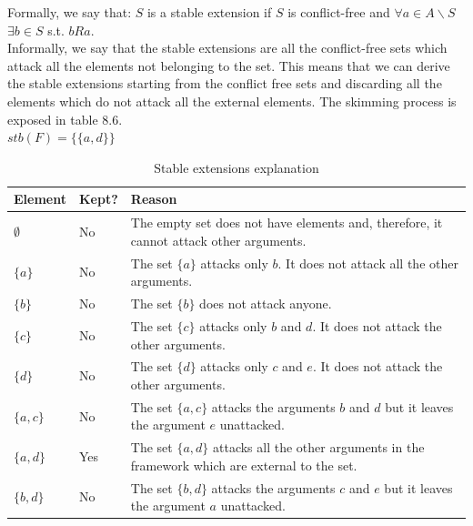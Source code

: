 \documentclass{scrbook}
\begin{document}
Formally, we say that: $S$ is a stable extension if $S$ is conflict-free and $\forall a \in A \smallsetminus S$ $\exists b \in S$ s.t. $bRa$. \\

Informally, we say that the stable extensions are all the conflict-free sets which attack all the elements not belonging to the set. This means that we can derive the stable extensions starting from the conflict free sets and discarding all the elements which do not attack all the external elements. The skimming process is exposed in table 8.6.\\

$stb(F) = \{\{a,d\}\}$ \\

\begin{table}[]
    \begin{tabularx}{\linewidth}{|p{5em}|p{4em}|X|} \hline
         \textbf{Element} & \textbf{Kept?} & \textbf{Reason} \\ \hline

        $\emptyset$ & No &
        The empty set does not have elements and, therefore, it cannot attack other arguments.\\ \hline

        $\{a\}$ & No &
        The set $\{a\}$ attacks only $b$. It does not attack all the other arguments.\\ \hline

        $\{b\}$ & No &
        The set $\{b\}$ does not attack anyone.\\ \hline

        $\{c\}$ & No &
        The set $\{c\}$ attacks only $b$ and $d$. It does not attack the other arguments.\\ \hline

        $\{d\}$ & No &
        The set $\{d\}$ attacks only $c$ and $e$. It does not attack the other arguments.\\ \hline

        $\{a,c\}$ & No &
        The set $\{a,c\}$ attacks the arguments $b$ and $d$ but it leaves the argument $e$ unattacked.\\ \hline

        $\{a,d\}$ & Yes &
        The set $\{a,d\}$ attacks all the other arguments in the framework which are external to the set.\\ \hline

        $\{b,d\}$ & No &
        The set $\{b,d\}$ attacks the arguments $c$ and $e$ but it leaves the argument $a$ unattacked.\\ \hline
    \end{tabularx}
    \caption{Stable extensions explanation}
\end{table}
\end{document}
